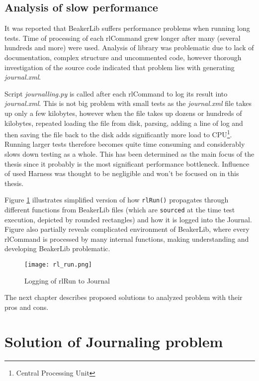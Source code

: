 \section{Analysis of slow performance}
It was reported that BeakerLib suffers performance problems when running long tests. Time of processing of each rlCommand grew longer after many (several hundreds and more) were used. Analysis of library was problematic due to lack of documentation, complex structure and uncommented code, however thorough investigation of the source code indicated that problem lies with generating \textit{journal.xml}. 

Script \textit{journalling.py} is called after each rlCommand to log its result into \textit{journal.xml}. This is not big problem with small tests as the \textit{journal.xml} file takes up only a few kilobytes, however when the file takes up dozens or hundreds of kilobytes, repeated loading the file from disk, parsing, adding a line of log and then saving the file back to the disk adds significantly more load to CPU\footnote{Central Processing Unit}. Running larger tests therefore becomes quite time consuming and considerably slows down testing as a whole.
This has been determined as the main focus of the thesis since it probably is the most significant performance bottleneck. Influence of used Harness was thought  to be negligible and won't be focused on in this thesis.

Figure \ref{fig:rl_run} illustrates simplified version of how \texttt{rlRun()} propagates through different functions from BeakerLib files (which are \texttt{sourced} at the time test execution,  depicted by rounded rectangles) and how it is logged into the Journal. Figure also partially reveals complicated environment of BeakerLib, where every rlCommand is processed by many internal functions, making understanding and developing BeakerLib problematic. 

\begin{figure}[h!]
  \texttt{[image: rl\_run.png]}
  \caption{Logging of rlRun to Journal}
  \label{fig:rl_run}
\end{figure}


The next chapter describes proposed solutions to analyzed problem with their pros and cons.


\chapter{Solution of Journaling problem}
\label{solutions}

